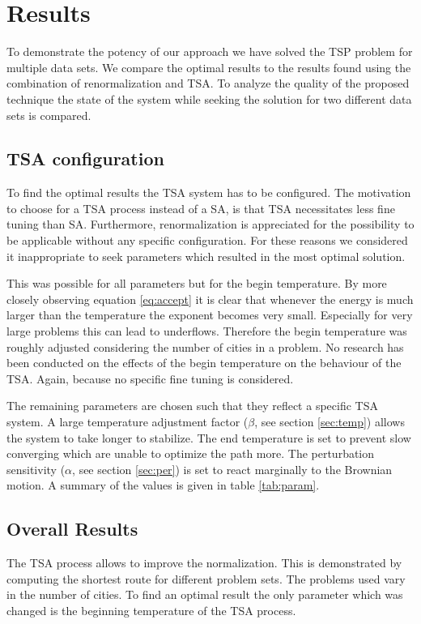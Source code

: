 \section{Results}
To demonstrate the potency of our approach we have solved the TSP problem for
multiple data sets. We compare the optimal results to the results found using
the combination of renormalization and TSA. To analyze the quality of the
proposed technique the state of the system while seeking the solution for two
different data sets is compared.

\subsection{TSA configuration}
To find the optimal results the TSA system has to be configured. The
motivation to choose for a TSA process instead of a SA, is that TSA
necessitates less fine tuning than SA. Furthermore, renormalization is 
appreciated for the possibility to be applicable without any specific
configuration. For these reasons we considered it inappropriate to seek
parameters which resulted in the most optimal solution.

This was possible for all parameters but for the begin temperature. By more
closely observing equation \eqref{eq:accept} it is clear that whenever the
energy is much larger than the temperature the exponent becomes very small.
Especially for very large problems this can lead to underflows. Therefore the
begin temperature was roughly adjusted considering the number of cities in a
problem. No research has been conducted on the effects of the begin
temperature on the behaviour of the TSA. Again, because no specific fine
tuning is considered.

The remaining parameters are chosen such that they reflect a specific TSA
system. A large temperature adjustment factor ($\beta$, see section
\ref{sec:temp}) allows the system to take longer to stabilize. The end
temperature is set to prevent slow converging which are unable to optimize the
path more. The perturbation sensitivity ($\alpha$, see section \ref{sec:per}) is set to
react marginally to the Brownian motion. A summary of the values is given in
table \ref{tab:param}.

\subsection{Overall Results}
The TSA process allows to improve the normalization. This is demonstrated by
computing the shortest route for different problem sets. The problems used vary in
the number of cities. To find an optimal result the only parameter which was
changed is the beginning temperature of the TSA process.

